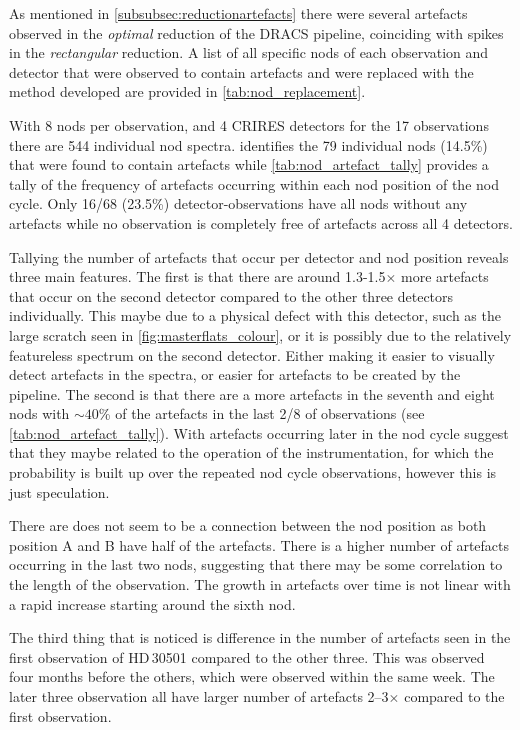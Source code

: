 As mentioned in \cref{subsubsec:reductionartefacts} there were several artefacts observed in the \emph{optimal} reduction of the {DRACS} pipeline, coinciding with spikes in the \emph{rectangular} reduction.
A list of all specific nods of each observation and detector that were observed to contain artefacts and were replaced with the method developed are provided in \cref{tab:nod_replacement}.

With 8 nods per observation, and 4 {CRIRES} detectors for the 17 observations there are 544 individual nod spectra.
 identifies the 79 individual nods (14.5\%) that were found to contain artefacts while \cref{tab:nod_artefact_tally} provides a tally of the frequency of artefacts occurring within each nod position of the nod cycle.
Only 16/68 (23.5\%) detector-observations have all nods without any artefacts while no observation is completely free of artefacts across all 4 detectors.

Tallying the number of artefacts that occur per detector and nod position reveals three main features. The first is that there are around 1.3-1.5$\times$ more artefacts that occur on the second detector compared to the other three detectors individually.
This maybe due to a physical defect with this detector, such as the large scratch seen in \cref{fig:masterflats_colour}, or it is possibly due to the relatively featureless spectrum on the second detector.
Either making it easier to visually detect artefacts in the spectra, or easier for artefacts to be created by the pipeline.
The second is that there are a more artefacts in the seventh and eight nods with $\sim40$\% of the artefacts in the last 2/8 of observations (see \cref{tab:nod_artefact_tally}).
With artefacts occurring later in the nod cycle suggest that they maybe related to the operation of the instrumentation, for which the probability is built up over the repeated nod cycle observations, however this is just speculation.

There are does not seem to be a connection between the nod position as both position A and B have half of the artefacts.
There is a higher number of artefacts occurring in the last two nods, suggesting that there may be some correlation to the length of the observation.
The growth in artefacts over time is not linear with a rapid increase starting around the sixth nod.

The third thing that is noticed is difference in the number of artefacts seen in the first observation of HD\,30501 compared to the other three.
This was observed four months before the others, which were observed within the same week.
The later three observation all have larger number of artefacts 2--3$\times$ compared to the first observation.

